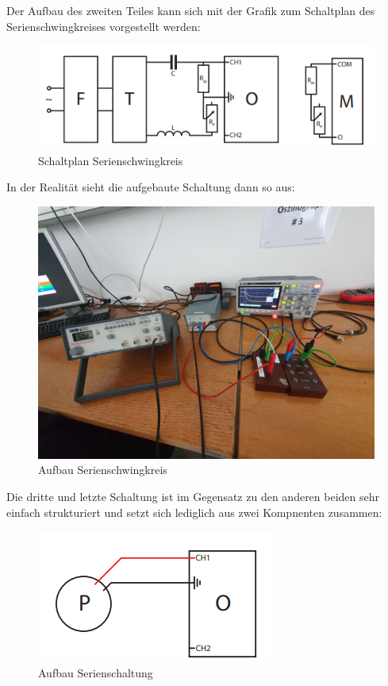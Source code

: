 \documentclass[12pt,a4paper,twoside]{article}
\begin{document}
\noindent
Der Aufbau des zweiten Teiles kann sich mit der Grafik zum Schaltplan des Serienschwingkreises vorgestellt werden:

\begin{figure}[H]
    \centering
    \includegraphics[width=0.6\linewidth, angle=0]{nudes/3.3 Serienschwingkreis.png}
    \caption{Schaltplan Serienschwingkreis}
    \label{fig:Schaltplan Serienschwingkreis}
\end{figure}

\noindent
In der Realität sieht die aufgebaute Schaltung dann so aus:

\begin{figure}[H]
    \centering
    \includegraphics[width=0.6\linewidth, angle=0]{nudes/Aufbau Serienschaltung.jpg}
    \caption{Aufbau Serienschwingkreis}
    \label{fig:Aufbau Serienschwingkreis}
\end{figure} 

\noindent
Die dritte und letzte Schaltung ist im Gegensatz zu den anderen beiden sehr einfach strukturiert und setzt sich lediglich aus zwei Kompnenten zusammen:

\begin{figure}[H]
    \centering
    \includegraphics[width=0.6\linewidth, angle=0]{nudes/3.4 Eigenfrequenz.png}
    \caption{Aufbau Serienschaltung}
    \label{fig:Schaltplan Eigenfrequenzbestimmung}
\end{figure}
\end{document}

